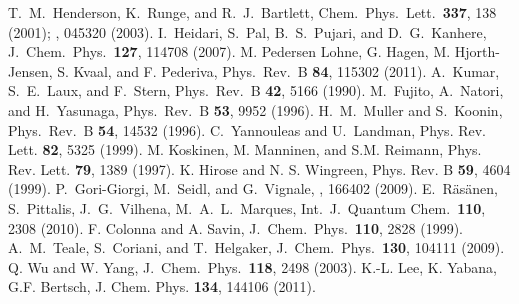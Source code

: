 \documentclass[twocolumn]{revtex4}
\begin{document}
\begin{thebibliography}{200}
 T.~M.~Henderson, K.~Runge, and R.~J.~Bartlett, Chem.~Phys.~Lett.~{\bf 337}, 138 (2001); , 045320 (2003).
 I.~Heidari, S.~Pal, B.~S.~Pujari, and D.~G.~Kanhere, J.~Chem.~Phys.~{\bf 127}, 
114708 (2007).
 M. Pedersen Lohne, G. Hagen, M. Hjorth-Jensen, S. Kvaal, and F. Pederiva, Phys.~Rev.~B {\bf 84}, 115302 (2011).
 A.~Kumar, S.~E.~Laux, and F.~Stern, Phys.~Rev.~B {\bf 42}, 5166 (1990).
 M.~Fujito, A.~Natori, and H.~Yasunaga, Phys.~Rev.~B {\bf 53}, 9952 (1996).
 H.~M.~Muller and S.~Koonin, Phys.~Rev.~B {\bf 54}, 14532 (1996).
 C.~Yannouleas and U.~Landman, Phys. Rev. Lett. {\bf 82}, 5325 (1999).
 M. Koskinen, M. Manninen, and S.M. Reimann, Phys. Rev. Lett. {\bf 79}, 1389 (1997).
 K. Hirose and N. S. Wingreen, Phys. Rev. B {\bf 59}, 4604 (1999).
 P.~Gori-Giorgi, M.~Seidl, and G.~Vignale, , 166402 (2009).
 E.~R\"as\"anen, S.~Pittalis, J.~G.~Vilhena, M.~A.~L.~Marques, Int.~J.~Quantum Chem.~{\bf 110}, 2308 (2010). 
 F. Colonna and A. Savin,  J.~Chem.~Phys.~{\bf 110},
2828 (1999).
  A.~M.~Teale, S.~Coriani, and T.~Helgaker, J.~Chem.~Phys.~{\bf 130},
104111 (2009).
 Q. Wu and W. Yang,  J.~Chem.~Phys.~{\bf 118}, 2498 (2003).
 K.-L. Lee, K. Yabana, G.F. Bertsch, J. Chem. Phys. {\bf 134}, 144106 (2011).

\end{thebibliography}
\end{document}
